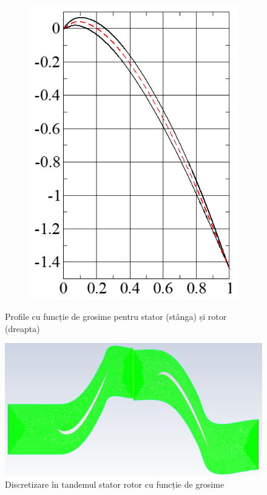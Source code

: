 \begin{figure}[h]
\begin{subfigure}[t]{0.42\textwidth}
    \includegraphics[width=\textwidth]{figures/rotor-thick-blade.PNG}
  \end{subfigure}
  \caption{Profile cu funcție de grosime pentru stator (stânga) și rotor (dreapta)}
\end{figure}

\begin{figure}
	\centering
	\includegraphics[scale=0.4]{figures/tandem_thick_mesh.PNG}
	\caption{Discretizare în tandemul stator rotor cu funcție de grosime}
	\label{Discretizare în tandemul stator rotor cu funcție de grosime}
\end{figure}


